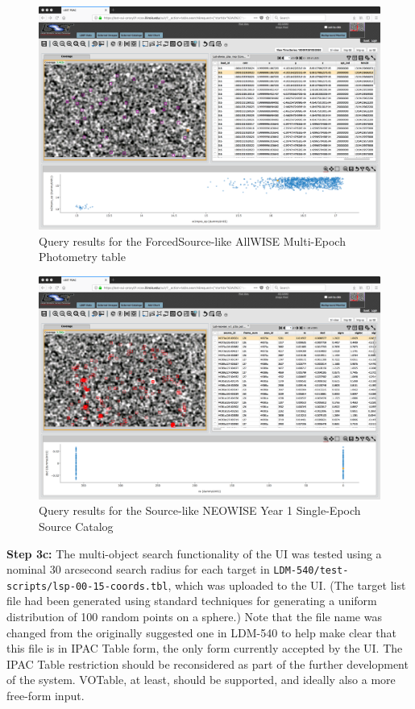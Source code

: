 \begin{figure}
  \includegraphics[width=\linewidth]{lsp-00-15/step3b-ForcedSource.png}
  \caption{Query results for the ForcedSource-like AllWISE Multi-Epoch Photometry table}
  \label{fig:lsp-00-15-cone-ForcedSource}
\end{figure}

\begin{figure}
  \includegraphics[width=\linewidth]{lsp-00-15/step3b-Source.png}
  \caption{Query results for the Source-like NEOWISE Year 1 Single-Epoch Source Catalog}
  \label{fig:lsp-00-15-cone-Source}
\end{figure}



\textbf{Step 3c:} The multi-object search functionality of the UI was tested using a nominal 30 arcsecond search radius for each target in \verb|LDM-540/test-scripts/lsp-00-15-coords.tbl|,
which was uploaded to the UI.
(The target list file had been generated using standard techniques for generating a uniform distribution of 100 random points on a sphere.)
Note that the file name was changed from the originally suggested one in LDM-540 to help make clear that this file is in IPAC Table form,
the only form currently accepted by the UI.
The IPAC Table restriction should be reconsidered as part of the further development of the system.
VOTable, at least, should be supported, and ideally also a more free-form input.

